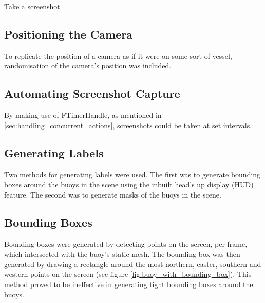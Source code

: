 \documentclass[10pt,twocolumn,letterpaper]{article}
\begin{document}
Take a screenshot



\subsection{Positioning the Camera}

To replicate the position of a camera as if it were on some sort of vessel, randomisation of the camera's position was included.

\subsection{Automating Screenshot Capture}

By making use of FTimerHandle, as mentioned in \ref{sec:handling_concurrent_actions}, screenshots could be taken at set intervals. 

\subsection{Generating Labels}

Two methods for generating labels were used. The first was to generate bounding boxes around the buoys in the scene using the inbuilt head's up display (HUD) feature. The second was to generate masks of the buoys in the scene. 

\subsection{Bounding Boxes}

Bounding boxes were generated by detecting points on the screen, per frame, which intersected with the buoy's static mesh. The bounding box was then generated by drawing a rectangle around the most northern, easter, southern and western points on the screen (see figure \ref{fig:buoy_with_bounding_box}). This method proved to be ineffective in generating tight bounding boxes around the buoys.
\end{document}
